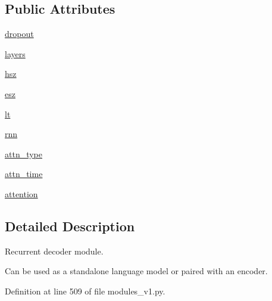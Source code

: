 \subsection*{Public Attributes}
\begin{DoxyCompactItemize}
\item 
\hyperlink{classparlai_1_1agents_1_1legacy__agents_1_1seq2seq_1_1modules__v1_1_1RNNDecoder_aafa9ff93604c33107620e2286d31bc81}{dropout}
\item 
\hyperlink{classparlai_1_1agents_1_1legacy__agents_1_1seq2seq_1_1modules__v1_1_1RNNDecoder_ae07b00d6b87da72582999538b279d57c}{layers}
\item 
\hyperlink{classparlai_1_1agents_1_1legacy__agents_1_1seq2seq_1_1modules__v1_1_1RNNDecoder_aab11ebf05dd6029a3db64b8170c552c7}{hsz}
\item 
\hyperlink{classparlai_1_1agents_1_1legacy__agents_1_1seq2seq_1_1modules__v1_1_1RNNDecoder_a6a0beb3ff226d0757b023acd8189366f}{esz}
\item 
\hyperlink{classparlai_1_1agents_1_1legacy__agents_1_1seq2seq_1_1modules__v1_1_1RNNDecoder_a6780484ed7624987b046a01952e48b4a}{lt}
\item 
\hyperlink{classparlai_1_1agents_1_1legacy__agents_1_1seq2seq_1_1modules__v1_1_1RNNDecoder_adc1ecb61f30e70d211f0d53adb399fd6}{rnn}
\item 
\hyperlink{classparlai_1_1agents_1_1legacy__agents_1_1seq2seq_1_1modules__v1_1_1RNNDecoder_acbbf1a67ceb9dc480faabf0db0fadb3d}{attn\+\_\+type}
\item 
\hyperlink{classparlai_1_1agents_1_1legacy__agents_1_1seq2seq_1_1modules__v1_1_1RNNDecoder_a596b3a31dc03cd19485d86ad7be90981}{attn\+\_\+time}
\item 
\hyperlink{classparlai_1_1agents_1_1legacy__agents_1_1seq2seq_1_1modules__v1_1_1RNNDecoder_a03c0b43494c2b18f4f6dcb04e14de8e1}{attention}
\end{DoxyCompactItemize}


\subsection{Detailed Description}
\begin{DoxyVerb}Recurrent decoder module.

Can be used as a standalone language model or paired with an encoder.
\end{DoxyVerb}
 

Definition at line 509 of file modules\+\_\+v1.\+py.



